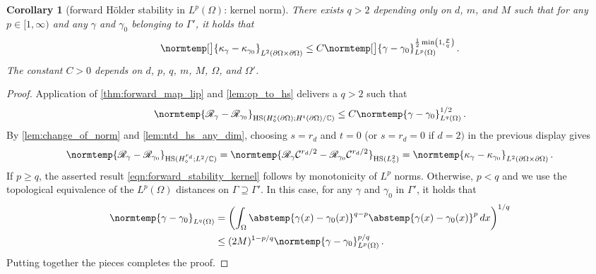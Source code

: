 \documentclass[pdflatex,sn-mathphys-num]{sn-jnl-preprint}
\let\originalleft\left %
\let\originalright\right
\renewcommand{\left}{\mathopen{}\mathclose\bgroup\originalleft}
\renewcommand{\right}{\aftergroup\egroup\originalright}
\newcommand{\C}{\mathbb{C}}
\newcommand{\cC}{\mathcal{C}}
\newcommand{\sR}{\mathscr{R}}
\newcommand{\pOmega}{{\partial\Omega}}
\newcommand{\ntd}{\mathscr{R}_{\gamma}}
\newcommand{\ntdz}{\mathscr{R}_{\gamma_0}}
\newcommand{\norm}{\normtemp}
\newcommand{\abs}{\abstemp}
\newcommand{\HS}{\mathrm{HS}} %
\newcommand{\diff}{d}
\newcommand{\dd}[1]{\,\diff{#1}}
\theoremstyle{thmstyleone}%
\newtheorem{corollary}[theorem]{Corollary}%
\theoremstyle{thmstyletwo}%
\theoremstyle{thmstylethree}%
\numberwithin{equation}{section}
\numberwithin{theorem}{section}
\begin{document}
\begin{corollary}[forward H\"older stability in $L^p(\Omega)$: kernel norm]\label{cor:forward_stability_kernel}
    There exists $q>2$ depending only on $d$, $m$, and $M$ such that for any $p\in[1,\infty)$ and any $\gamma$ and $\gamma_0$ belonging to $\Gamma'$, it holds that
	\begin{align}\label{eqn:forward_stability_kernel}
		\norm[\big]{\kappa_\gamma-\kappa_{\gamma_0}}_{L^2(\partial\Omega\times\partial\Omega)}\leq C\norm[\big]{\gamma-\gamma_0}_{L^p(\Omega)}^{\frac12\min\left(1, \frac{p}{q}\right)}\,.
	\end{align}
	The constant $C>0$ depends on $d$, $p$, $q$, $m$, $M$, $\Omega$, and $\Omega'$.
\end{corollary}
\begin{proof}
    Application of \cref{thm:forward_map_lip} and \cref{lem:op_to_hs} delivers a $q>2$ such that
    \begin{align*}
        \norm{\ntd-\sR_{\gamma_0}}_{\HS(H^s_\diamond(\pOmega);H^t(\pOmega)/\C)}
            \leq 
            C\norm{\gamma-\gamma_0}^{1/2}_{L^q(\Omega)}\,.
    \end{align*}
    By \cref{lem:change_of_norm} and \cref{lem:ntd_hs_any_dim}, choosing $s=r_d$ and $t=0$ (or $s=r_d=0$ if $d=2)$ in the previous display gives
    \begin{align*}
        \norm{\ntd-\sR_{\gamma_0}}_{\HS(H^{r_d}_\diamond;L^2/\C)}
        =
        \norm{\ntd \cC^{r_d/2}-\ntdz \cC^{r_d/2}}_{\HS(L_\diamond^2)}=\norm{\kappa_\gamma-\kappa_{\gamma_0}}_{L^2(\partial\Omega\times\partial\Omega)}\,.
    \end{align*}
    If $p\geq q$, the asserted result \eqref{eqn:forward_stability_kernel} follows by monotonicity of $L^p$ norms. Otherwise, $p<q$ and we use the topological equivalence of the $L^p(\Omega)$ distances on $\Gamma\supseteq\Gamma'$. 
    In this case, for any $\gamma$ and $\gamma_0$ in $\Gamma'$, it holds that
    \begin{align*}
        \norm{\gamma-\gamma_0}_{L^q(\Omega)}&=\biggl(\int_\Omega\abs{\gamma(x)-\gamma_0(x)}^{q-p}\abs{\gamma(x)-\gamma_0(x)}^{p}\dd{x}\biggr)^{1/q}\\
        &\leq (2M)^{1-p/q}\norm{\gamma-\gamma_0}_{L^p(\Omega)}^{p/q}\,.
    \end{align*}
    Putting together the pieces completes the proof.
\end{proof}
\end{document}
